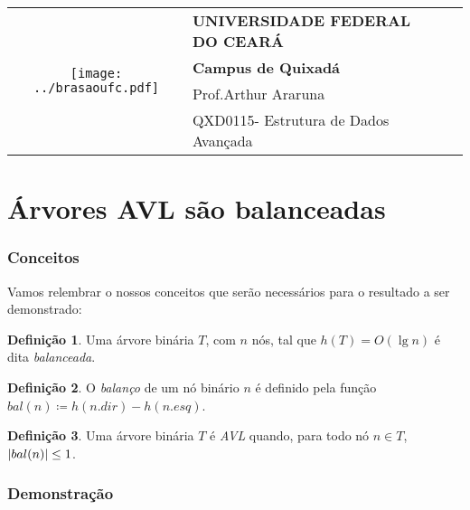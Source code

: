 \documentclass[11pt,twoside]{article}
\DeclarePairedDelimiter{\abs}{\lvert}{\rvert}
\theoremstyle{definition}
\newtheorem{definition}{Definição}[section]
\def\disciplinacodigotext{QXD0115}
\def\disciplinanometext{Estrutura de Dados Avançada}
\def\provatitle{Árvores AVL são balanceadas}
\def\professorabbrv{Prof.}
\def\professornometext{Arthur Araruna}
\begin{document}
\noindent
\begin{minipage}{\textwidth}
	\begin{tabularx}{\textwidth}{cXc}
		\multirow{4}{*}{\texttt{[image: ../brasaoufc.pdf]}} & {\bf UNIVERSIDADE FEDERAL DO CEARÁ}         & \multirow{3}{*}{} \\
		                                                                  & {\bf Campus de Quixadá}                     &                   \\
		                                                                  & \professorabbrv\enspace\professornometext   &                   \\
		                                                                  & \disciplinacodigotext - \disciplinanometext & {}                \\
	\end{tabularx}
\end{minipage}

\part*{\provatitle}

\section{Conceitos}

Vamos relembrar o nossos conceitos que serão necessários para o resultado a ser demonstrado:

\begin{definition}
	Uma árvore binária \( T \), com \( n \) nós, tal que \( h(T) = O(\lg n) \) é dita \emph{balanceada}.
\end{definition}

\begin{definition}
	O \emph{balanço} de um nó binário \( n \) é definido pela função \( bal(n) \coloneqq h(n.dir) - h(n.esq) \).
\end{definition}

\begin{definition}
	Uma árvore binária \( T \) é \emph{AVL} quando, para todo nó \( n \in T \), \( \abs{bal(n)} \leq 1 \).
\end{definition}

\section{Demonstração}
\end{document}
